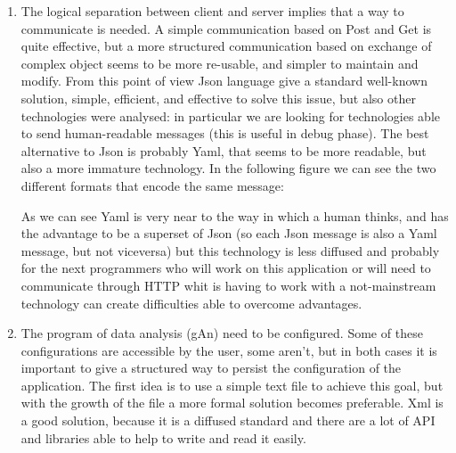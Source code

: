 \begin{enumerate}
\item
The logical separation between client and server implies that a way to communicate is needed. A simple communication based on Post and Get is quite effective, but a more structured communication based on exchange of complex object seems to be more re-usable, and simpler to maintain and modify. From this point of view Json language give a standard well-known solution, simple, efficient, and effective to solve this issue, but also other technologies were analysed: in particular we are looking for technologies able to send human-readable messages (this is useful in debug phase). The best alternative to Json is probably Yaml, that seems to be more readable, but also a more immature technology. In the following figure we can see the two different formats that encode the same message:


As we can see Yaml is very near to the way in which a human thinks, and has the advantage to be a superset of Json (so each Json message is also a Yaml message, but not viceversa) but this technology is less diffused and probably for the next programmers who will work on this application or will need to communicate through HTTP whit is having to work with a not-mainstream technology can create difficulties able to overcome advantages. 

\item
The program of data analysis (gAn) need to be configured. Some of these configurations are accessible by the user, some aren't, but in both cases it is important to give a structured way to persist the configuration of the application. The first idea is to use a simple text file to achieve this goal, but with the growth of the file a more formal solution becomes preferable. Xml is a good solution, because it is a diffused standard and there are a lot of API and libraries able to help to write and read it easily.


\end{enumerate}
